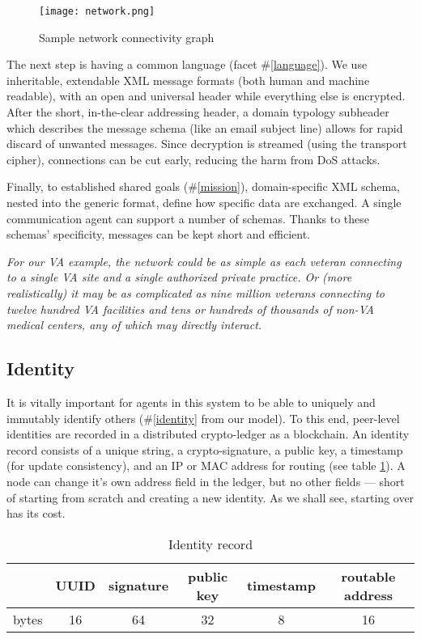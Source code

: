 \documentclass[10pt, twoside]{article}
\newenvironment{ppl}{\fontfamily{ppl}\selectfont\itshape}{\par}
\begin{document}
\begin{figure}
	\centering
	\texttt{[image: network.png]}
	\caption{Sample network connectivity graph}
	\label{figure:network}
\end{figure}


The next step is having a common language (facet \#\ref{language}). We use inheritable, extendable XML message formats (both human and machine readable), with an open and universal header while everything else is encrypted. After the short, in-the-clear addressing header, a domain typology subheader which describes the message schema (like an email subject line) allows for rapid discard of unwanted messages. Since decryption is streamed (using the transport cipher), connections can be cut early, reducing the harm from DoS attacks.

Finally, to established shared goals (\#\ref{mission}), domain-specific XML schema, nested into the generic format, define how specific data are exchanged. A single communication agent can support a number of schemas. Thanks to these schemas' specificity, messages can be kept short and efficient.


\begin{ppl}
For our VA example, the network could be as simple as each veteran connecting to a single VA site and a single authorized private practice. Or (more realistically) it may be as complicated as nine million veterans connecting to twelve hundred VA facilities and tens or hundreds of thousands of non-VA medical centers, any of which may directly interact.
\end{ppl}


\subsection{Identity} \label{id}

It is vitally important for agents in this system to be able to uniquely and immutably identify others (\#\ref{identity} from our model). To this end, peer-level identities are recorded in a distributed crypto-ledger as a blockchain. An identity record consists of a unique string, a crypto-signature, a public key, a timestamp (for update consistency), and an IP or MAC address for routing (see table \ref{table:identity}). A node can change it's own address field in the ledger, but no other fields --- short of starting from scratch and creating a new identity. As we shall see, starting over has its cost.

\begin{table}[h!]
\centering
\begin{tabular}{ |l||c|c|c|c|c| }
	\hline
	& UUID & signature & public key & timestamp & routable address \\
	\hline
	bytes & 16 & 64 & 32 & 8 & 16 \\
	\hline
\end{tabular}
\caption{Identity record}
\label{table:identity}
\end{table}
\end{document}
